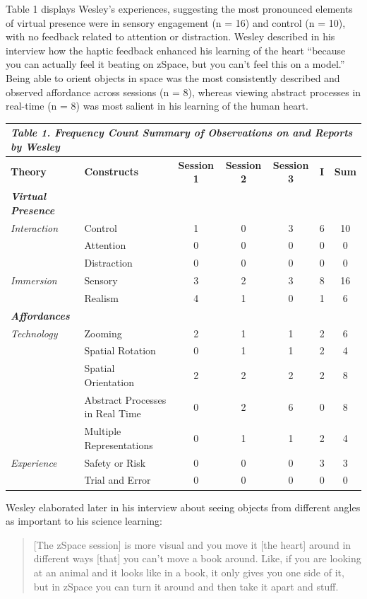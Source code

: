 \documentclass[11.5pt]{sig-alternate} %
\begin{document}
\begin{large}
Table 1 displays Wesley’s experiences, suggesting the most pronounced elements of virtual presence were in sensory engagement (n = 16) and control (n = 10), with no feedback related to attention or distraction. Wesley described in his interview how the haptic feedback enhanced his learning of the heart “because you can actually feel it beating on zSpace, but you can’t feel this on a model.” Being able to orient objects in space was the most consistently described and observed affordance across sessions (n = 8), whereas viewing abstract processes in real-time (n = 8) was most salient in his learning of the human heart.  

\begin{table}
\begin{tabular}{llccccc}
\hline
\multicolumn{7}{l}{\textit{\textbf{Table 1.} Frequency Count Summary of Observations on and Reports by Wesley}} \\
\hline
\textbf{Theory} & \textbf{Constructs} & \textbf{Session 1} & \textbf{Session 2} & \textbf{Session 3} & \textbf{I} & \textbf{Sum} \\
\hline
\textit{\textbf{Virtual Presence}} & & & & & & \\
\textit{Interaction} & Control & 1 & 0 & 3 & 6 & 10 \\
 & Attention & 0 & 0 & 0 & 0 & 0 \\
 & Distraction & 0 & 0 & 0 & 0 & 0 \\
\textit{Immersion} & Sensory & 3 & 2 & 3 & 8 & 16 \\
 & Realism & 4 & 1 & 0 & 1 & 6 \\
\hline
\textit{\textbf{Affordances}} & & & & & & \\
\textit{Technology} & Zooming & 2 & 1 & 1 & 2 & 6 \\
 & Spatial Rotation & 0 & 1 & 1 & 2 & 4 \\
 & Spatial Orientation & 2 & 2 & 2 & 2 & 8 \\
 & Abstract Processes in Real Time & 0 & 2 & 6 & 0 & 8 \\
 & Multiple Representations & 0 & 1 & 1 & 2 & 4 \\
\textit{Experience} & Safety or Risk & 0 & 0 & 0 & 3 & 3 \\
 & Trial and Error & 0 & 0 & 0 & 0 & 0 \\
\hline
\end{tabular}
\end{table}

Wesley elaborated later in his interview about seeing objects from different angles as important to his science learning: 
\begin{quote}
[The zSpace session] is more visual and you move it [the heart] around in different ways [that] you can’t move a book around. Like, if you are looking at an animal and it looks like in a book, it only gives you one side of it, but in zSpace you can turn it around and 	then take it apart and stuff.
\end{quote}


\end{large}
\end{document}
